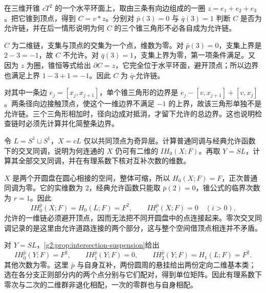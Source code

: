 \begin{exercise}\label{g2:ex:allowable-total-boundary}
	在三维开锥 \(cT^2\) 的一个水平环面上，取由三条有向边组成的一圈 \(z=e_1+e_2+e_3\)。把它锥到顶点，得到 \(C=v*z\)。分别对 \(\bar p(3)=0\) 与 \(\bar q(3)=1\) 判断 \(C\) 是否为允许链，并在后一情形说明为何 \(C\) 的三个锥三角形不必各自成为允许链。
\end{exercise}
\begin{solution}
	\(C\) 为二维链，支集与顶点的交集为一个点，维数为零。对 \(\bar p(3)=0\)，支集上界是 \(2-3=-1\)，故 \(C\) 不允许。对 \(\bar q(3)=1\)，支集上界为零，第一项条件满足。又因为 \(z\) 为圈，锥恒等式给出 \(\partial C=z\)，它完全位于水平环面，避开顶点；所以边界也满足上界 \(1-3+1=-1\)。因此 \(C\) 为 \(\bar q\)-允许链。

	对其中一条边 \(e_j=[x_j,x_{j+1}]\)，单个锥三角形的边界是 \(e_j-[v,x_{j+1}]+[v,x_j]\)。两条径向边接触顶点，使这个一维边界不满足 \(-1\) 的上界，故该三角形单独不是允许链。三个三角形相加时，径向边成对抵消，才留下允许的总边界。这也说明检查链时必须先计算并化简整条边界。
\end{solution}

\begin{exercise}\label{g2:ex:cone-disconnected-link}
	令 \(L=S^1\sqcup S^1\)，\(X=cL\) 仅以共同顶点为奇异层。计算普通同调与经典允许函数下的交叉同调，说明为何连通的 \(X\) 仍可有二维的 \(IH_0(X;F)\)。再取 \(Y=SL\)，计算其全部交叉同调，并在有理系数下核对互补次数的维数。
\end{exercise}
\begin{solution}
	\(X\) 是两个开圆盘在圆心相接的空间，整体可缩，所以 \(H_0(X;F)=F\)，正次普通同调为零。它的实维数为 \(2\)，经典允许函数只能取 \(\bar p(2)=0\)，锥公式的临界次数为 \(r=1\)。因此
	\[
		IH_0^{\bar p}(X;F)=H_0(L;F)=F^2,
		\qquad IH_i^{\bar p}(X;F)=0\quad(i>0).
	\]
	允许的一维链必须避开顶点，因而无法把不同开圆盘中的点连接起来。零次交叉同调记录的是这里由允许道路连接的两个部分，这与整个空间借顶点相连并不矛盾。

	对 \(Y=SL\)，\cref{g2:prop:intersection-suspension}给出
	\[
		IH_0^{\bar p}(Y;F)=F^2,\qquad IH_1^{\bar p}(Y;F)=0,
		\qquad IH_2^{\bar p}(Y;F)=H_1(L;F)=F^2.
	\]
	其他次数为零。这里 \(\bar p\) 与自身互补，两份圆周的悬挂给出两份定向二维基本类；选在各分支正则部分内的两个点分别与它们配对，得到单位矩阵。因此有理系数下零次与二次的二维群非退化相配，一次的零群也与自身相配。
\end{solution}

